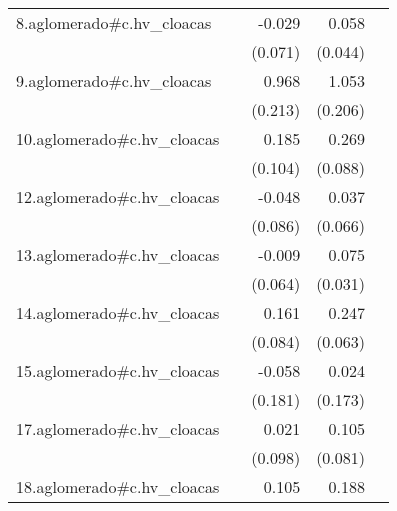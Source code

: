 {\begin{longtable}{l*{4}{D{.}{.}{-1}}}
\addlinespace
8.aglomerado#c.hv\_cloacas&                     &      -0.029         &       0.058         &                     \\
            &                     &     (0.071)         &     (0.044)         &                     \\
\addlinespace
9.aglomerado#c.hv\_cloacas&                     &       0.968\sym{***}&       1.053\sym{***}&                     \\
            &                     &     (0.213)         &     (0.206)         &                     \\
\addlinespace
10.aglomerado#c.hv\_cloacas&                     &       0.185         &       0.269\sym{**} &                     \\
            &                     &     (0.104)         &     (0.088)         &                     \\
\addlinespace
12.aglomerado#c.hv\_cloacas&                     &      -0.048         &       0.037         &                     \\
            &                     &     (0.086)         &     (0.066)         &                     \\
\addlinespace
13.aglomerado#c.hv\_cloacas&                     &      -0.009         &       0.075\sym{*}  &                     \\
            &                     &     (0.064)         &     (0.031)         &                     \\
\addlinespace
14.aglomerado#c.hv\_cloacas&                     &       0.161         &       0.247\sym{***}&                     \\
            &                     &     (0.084)         &     (0.063)         &                     \\
\addlinespace
15.aglomerado#c.hv\_cloacas&                     &      -0.058         &       0.024         &                     \\
            &                     &     (0.181)         &     (0.173)         &                     \\
\addlinespace
17.aglomerado#c.hv\_cloacas&                     &       0.021         &       0.105         &                     \\
            &                     &     (0.098)         &     (0.081)         &                     \\
\addlinespace
18.aglomerado#c.hv\_cloacas&                     &       0.105         &       0.188\sym{***}&                     \\

\end{longtable}}
